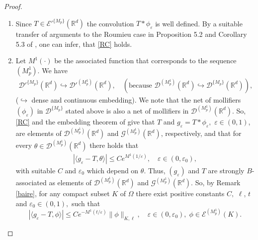 \documentclass[sn-mathphys,Numbered]{sn-jnl}%
\theoremstyle{thmstyleone}%
\theoremstyle{thmstyletwo}%
\theoremstyle{thmstylethree}%
\begin{document}
\begin{proof}
\begin{enumerate}
\item[a)] Since $T\in\mathcal E'^{\{M_p\}}(\mathbb R^d)$ the convolution $T*\phi_\varepsilon$ is well defined. By a suitable transfer of arguments to the Roumieu case in Proposition 5.2 and  Corollary 5.3  of  \cite{D.V.1}, one can infer,   that \eqref{RC} holds.
\item[b)] Let  $M^1(\cdot)$ be the associated function  that corresponds to the sequence $(M^1_p).$ We have
\begin{align*}
\mathcal D'^{\{M_p\}}(\mathbb R^d)\hookrightarrow \mathcal D'^{(M^1_p)}(\mathbb R^d),    \quad \left(\text{because } \mathcal D^{(M_p^1)}(\mathbb R^d)\hookrightarrow \mathcal D^{\{M_p\}}(\mathbb R^d)\right),
\end{align*}
($\hookrightarrow$ dense and continuous embedding). We note that the net of mollifiers $(\phi_\varepsilon)$ in $\mathcal D^{\{M_p\}}$ stated above is also a net of mollifiers in $\mathcal D^{(M^1_p)}(\mathbb R^d).$  So, \eqref{RC} and the embedding theorem of \cite{D.V.1} give that $T$ and $g_\varepsilon=T*\phi_\varepsilon, $ $\varepsilon\in(0,1)$,  are elements  of $ \mathcal D^{(M^1_p)}(\mathbb R^d)$ and $\mathcal G^{(M^1_p)}(\mathbb R^d)$,  respectively,  and  that for every $\theta\in\mathcal D^{(M_p^1)}(\mathbb R^d)$ there holds that 
\begin{align*}
|\langle g_\varepsilon-T,\theta\rangle|\leq Ce^{M^1(1/\varepsilon)}, \quad \varepsilon\in(0,\varepsilon_0),
\end{align*} 
with suitable $C$ and $\varepsilon_0$ which depend on $\theta$. Thus,  $(g_\varepsilon)$ and $T$ are strongly $B$-associated as elements of  $\mathcal D^{(M^1_p)}(\mathbb R^d)$ and $\mathcal G^{(M^1_p)}(\mathbb R^d)$.  So, by Remark \ref{baire}, for any compact subset $K$ of $\Omega$ there exist positive constants $C, $ $\ell$, $t$ and $\varepsilon_0\in(0,1),$ such that 
\begin{equation*}%
|\langle g_{\varepsilon} -T, \phi\rangle| \leq C e^{-M^1(t/\varepsilon)} \|\phi\|_{K,\ell},\quad \varepsilon\in(0,\varepsilon_0),\;  \phi\in \mathcal E^{(M^1_p)}(K).
\end{equation*}
   

\end{enumerate}
\end{proof}
\end{document}
